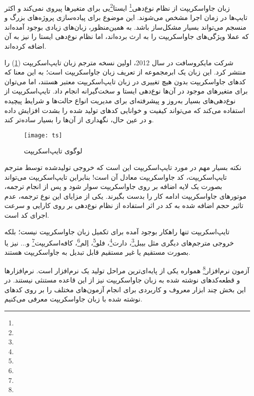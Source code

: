 
زبان جاواسکریپت از نظام نوع‌دهی\footnote{} ایستا\footnote{}یی برای متغیرها پیروی نمی‌کند و اکثر تایپ‌ها در زمان اجرا مشخص می‌شوند. این موضوع برای پیاده‌سازی پروژه‌های بزرگ و منسجم می‌تواند بسیار مشکل‌ساز باشد. به همین‌منظور، زبان‌های زیادی بوجود آمده‌اند که عملا ویژگی‌های جاواسکریپت را به ارث برده‌اند، اما نظام نوع‌دهی ایستا را نیز به آن اضافه کرده‌اند\cite{wiki:ts}.

شرکت مایکروسافت در سال 2012، اولین نسخه مترجم زبان تایپ‌اسکریپت (\cref{fig:ts}) را منتشر کرد. این زبان یک ابرمجموعه از تعریف زبان جاواسکریپت است؛ به این معنا که کدهای جاواسکریپت بدون هیچ تغییری در زبان تایپ‌اسکریپت معتبر هستند، اما می‌توان برای متغیرهای موجود در آن‌ها نوع‌دهی ایستا و سخت‌گیرانه انجام داد. تایپ‌اسکریپت از نوع‌دهی‌های بسیار به‌روز و پیشرفته‌ای برای مدیریت انواع حالت‌ها و شرایط پیچیده استفاده می‌کند که می‌تواند کیفیت و خوانایی کدهای تولید شده را بشدت افزایش داده و در عین حال، نگهداری از آن‌ها را بسیار ساده‌تر کند\cite{wiki:ts}.

\begin{figure}[H]
	\centering
	\texttt{[image: ts]}
	\caption{لوگوی تایپ‌اسکریپت}
	\label{fig:ts}
\end{figure}


نکته بسیار مهم در مورد تایپ‌اسکریپت این است که خروجی تولیدشده توسط مترجم تایپ‌اسکریپت، کد جاواسکریپت معادل آن است! بنابراین تایپ‌اسکریپت می‌تواند بصورت یک لایه اضافه بر روی جاواسکریپت سوار شود و پس از انجام ترجمه، موتورهای جاواسکریپت ادامه کار را بدست بگیرند. یکی از مزایای این نوع ترجمه، عدم تاثیر حجم اضافه شده به کد در اثر استفاده از نظام نوع‌دهی بر روی کارایی و سرعت اجرای کد است.

تایپ‌اسکریپت تنها راهکار بوجود آمده برای تکمیل زبان جاواسکریپت نیست؛ بلکه خروجی مترجم‌های دیگری مثل بیبل\footnote{}، دارت\footnote{}، فلو\footnote{}، اِلم\footnote{}، کافه‌اسکریپت\footnote{} و... نیز یا بصورت مستقیم یا غیر مستقیم قابل تبدیل به جاواسکریپت هستند\cite{wiki:ts}.


آزمون نرم‌افزار\footnote{} همواره یکی از پایه‌ای‌ترین مراحل تولید یک نرم‌افزار است. نرم‌افزارها و قطعه‌کدهای نوشته شده به زبان جاواسکریپت نیز از این قاعده مستنثی نیستند. در این بخش چند ابزار معروف و کاربردی برای انجام آزمون‌های مختلف را بر روی کدهای نوشته شده با زبان جاواسکریپت معرفی می‌کنیم.

